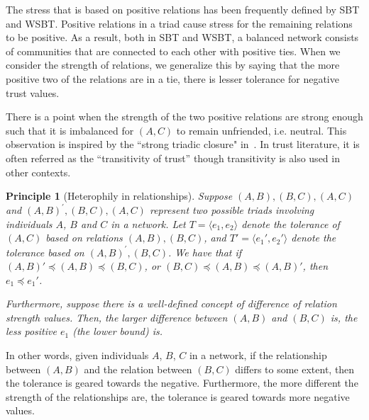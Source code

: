 \documentclass[acmtweb]{acmsmall}
\newtheorem{principle}{Principle}
\newcommand{\tuple}[2] {\langle #1,#2\rangle}
\begin{document}
The stress that is based on positive relations has been frequently
defined by SBT and WSBT. Positive relations in a triad cause stress
for the remaining relations to be positive. As a result, both in SBT
and WSBT, a balanced network consists of communities that are
connected to each other with positive ties. When we consider the
strength of relations, we generalize this by saying that the more
positive two of the relations are in a tie, there is lesser tolerance
for negative trust values.

There is a point when the strength of the two positive relations are
strong enough such that it is imbalanced for $(A,C)$ to remain
unfriended, i.e. neutral. This observation is inspired by the ``strong
triadic closure" in~\cite{kleinberg-book}. In trust literature, it is
often referred as the ``transitivity of trust'' though transitivity is
also used in other contexts.

\begin{principle} [Heterophily in relationships] 
Suppose $(A,B),(B,C),(A,C)$ and $(A,B)^{'},(B,C),(A,C)$ represent two
possible triads involving individuals $A$, $B$ and $C$ in a
network. Let $T=\tuple{e_1}{e_2}$ denote the tolerance of $(A,C)$
based on relations $(A,B),(B,C)$, and $T'=\tuple{e_1'}{e_2'}$ denote
the tolerance based on $(A,B)^{'},(B,C)$. We have that if $(A,B)'
\preceq (A,B) \preceq (B,C)$, or $(B,C) \preceq (A,B) \preceq (A,B)'$,
then $e_1\preceq e_1'$.

Furthermore, suppose there is a well-defined concept of difference of
relation strength values. Then, the larger difference between $(A,B)$
and $(B,C)$ is, the less positive $e_1$ (the lower bound) is.
\end{principle}

In other words, given individuals $A$, $B$, $C$ in a network, if the
relationship between $(A,B)$ and the relation between $(B,C)$ differs
to some extent, then the tolerance is geared towards the
negative. Furthermore, the more different the strength of the
relationships are, the tolerance is geared towards more negative
values.
\end{document}
